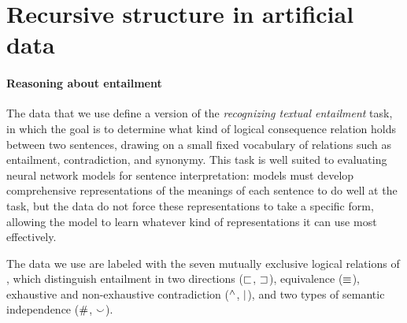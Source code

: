\section{Recursive structure in artificial data}\label{sec:recursion}
\paragraph{Reasoning about entailment} 
The data that we use define a version of the \emph{recognizing textual entailment} task, in which the goal is to determine what kind of logical consequence relation holds between two sentences, drawing on a small fixed vocabulary of relations such as entailment, contradiction, and synonymy. This task is well suited to evaluating neural network models for sentence interpretation: models must develop comprehensive representations of the meanings of each sentence to do well at the task, but the data do not force these representations to take a specific form, allowing the model to learn whatever kind of representations it can use most effectively.

The data we use are labeled with the seven mutually exclusive logical relations of , which distinguish entailment in two directions ($\sqsubset$, $\sqsupset$), equivalence ($\equiv$), exhaustive and non-exhaustive contradiction ($\mathbin{^{\wedge}}$, $\mathbin{|}$), and two types of semantic independence ($\mathbin{\#}$, $\mathbin{\smallsmile}$).



